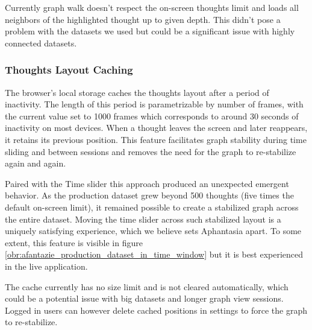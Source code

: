 Currently graph walk doesn't respect the on-screen thoughts limit and loads all neighbors of the highlighted thought up to given depth. This didn't pose a problem with the datasets we used but could be a significant issue with highly connected datasets.

\subsubsection*{Thoughts Layout Caching}
The browser’s local storage caches the thoughts layout after a period of inactivity.
The length of this period is parametrizable by number of frames,
with the current value set to 1000 frames which corresponds to around 30 seconds of inactivity on most devices.
When a thought leaves the screen and later reappears, it retains its previous position.
This feature facilitates graph stability during time sliding and between sessions and removes the need for the graph to re-stabilize again and again.

Paired with the Time slider this approach produced an unexpected emergent behavior. As the \gls{production} dataset grew beyond 500 thoughts (five times the default on-screen limit), it remained possible to create a stabilized graph across the entire dataset.
Moving the time slider across such stabilized layout is a uniquely satisfying experience, which we believe sets Aphantasia apart.
To some extent, this feature is visible in figure \ref{obr:afantazie_production_dataset_in_time_window} but it is best experienced in the live application.

The cache currently has no size limit and is not cleared automatically, which could be a potential issue with big datasets and longer graph view sessions.
Logged in users can however delete cached positions in settings to force the graph to re-stabilize.

